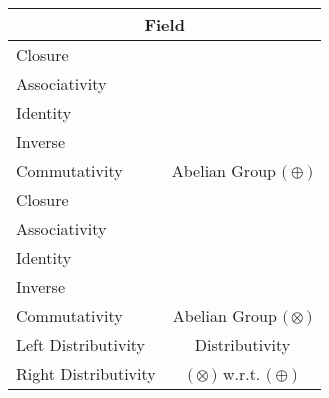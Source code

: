 \documentclass[a4paper,12pt]{scrartcl}
\newcommand{\OpA}{\otimes}
\newcommand{\OpB}{\oplus}
\begin{document}
\begin{minipage}[c]{0,5\textwidth}

\begin{tabular}{|l|c|} %
  \hline
  \multicolumn{2}{c}{\cellcolor{green!25}Field} \\
  \hline
    \cellcolor{blue!25} Closure& \cellcolor{yellow!25}  \\
    \cellcolor{blue!25} Associativity& \cellcolor{yellow!25}  \\
    \cellcolor{blue!25} Identity& \cellcolor{yellow!25} \\
    \cellcolor{blue!25} Inverse& \cellcolor{yellow!25} \\
    \cellcolor{blue!25} Commutativity& \multirow{-5}{*}{\tiny\cellcolor{yellow!25}Abelian Group $\big(\OpB\big)$} \\
   \hline
    \cellcolor{blue!25} Closure& \cellcolor{yellow!25}  \\
    \cellcolor{blue!25} Associativity& \cellcolor{yellow!25}  \\
    \cellcolor{blue!25} Identity& \cellcolor{yellow!25} \\
    \cellcolor{blue!25} Inverse& \cellcolor{yellow!25} \\
    \cellcolor{blue!25} Commutativity& \multirow{-5}{*}{\tiny\cellcolor{yellow!25}Abelian Group $\big(\OpA\big)$} \\
  \hline
    \cellcolor{blue!25} Left Distributivity&  \tiny\cellcolor{yellow!25}Distributivity\\
    \cellcolor{blue!25} Right Distributivity & \tiny\cellcolor{yellow!25} $\big(\OpA\big)$ w.r.t. $\big(\OpB\big)$  \\
   \hline
\end{tabular}


\end{minipage}
\end{document}
